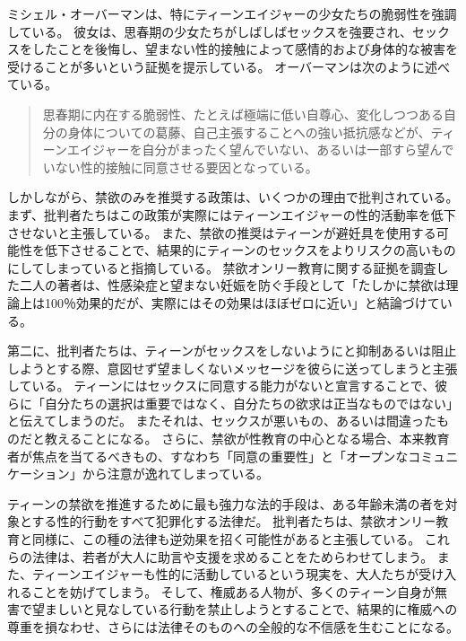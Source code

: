 \documentclass[paper=a4,book,openany]{jlreq}
\begin{document}
ミシェル・オーバーマンは、特にティーンエイジャーの少女たちの脆弱性を強調している。
彼女は、思春期の少女たちがしばしばセックスを強要され、セックスをしたことを後悔し、望まない性的接触によって感情的および身体的な被害を受けることが多いという証拠を提示している。
オーバーマンは次のように述べている。

\begin{quote}
思春期に内在する脆弱性、たとえば極端に低い自尊心、変化しつつある自分の身体についての葛藤、自己主張することへの強い抵抗感などが、ティーンエイジャーを自分がまったく望んでいない、あるいは一部すら望んでいない性的接触に同意させる要因となっている。
\citep[p.709]{oberman01:_girls_master_house}
\end{quote}

しかしながら、禁欲のみを推奨する政策は、いくつかの理由で批判されている。
まず、批判者たちはこの政策が実際にはティーンエイジャーの性的活動率を低下させないと主張している。
また、禁欲の推奨はティーンが避妊具を使用する可能性を低下させることで、結果的にティーンのセックスをよりリスクの高いものにしてしまっていると指摘している。
禁欲オンリー教育に関する証拠を調査した二人の著者は、性感染症と望まない妊娠を防ぐ手段として「たしかに禁欲は理論上は100％効果的だが、実際にはその効果はほぼゼロに近い」と結論づけている\citep{santelli06:_abstin_abstin_only_educat}。

第二に、批判者たちは、ティーンがセックスをしないようにと抑制あるいは阻止しようとする際、意図せず望ましくないメッセージを彼らに送ってしまうと主張している。
ティーンにはセックスに同意する能力がないと宣言することで、彼らに「自分たちの選択は重要ではなく、自分たちの欲求は正当なものではない」と伝えてしまうのだ。
またそれは、セックスが悪いもの、あるいは間違ったものだと教えることになる。
さらに、禁欲が性教育の中心となる場合、本来教育者が焦点を当てるべきもの、すなわち「同意の重要性」と「オープンなコミュニケーション」から注意が逸れてしまっている。

ティーンの禁欲を推進するために最も強力な法的手段は、ある年齢未満の者を対象とする性的行動をすべて犯罪化する法律だ。
批判者たちは、禁欲オンリー教育と同様に、この種の法律も逆効果を招く可能性があると主張している。
これらの法律は、若者が大人に助言や支援を求めることをためらわせてしまう。
また、ティーンエイジャーも性的に活動しているという現実を、大人たちが受け入れることを妨げてしまう。
そして、権威ある人物が、多くのティーン自身が無害で望ましいと見なしている行動を禁止しようとすることで、結果的に権威への尊重を損なわせ、さらには法律そのものへの全般的な不信感を生むことになる。
\end{document}
